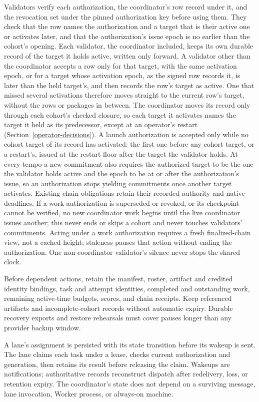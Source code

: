 Validators verify each authorization, the coordinator's row record under it,
and the revocation set under the pinned authorization key before using them.
They check that the row names the authorization and a target that is their
active one or activates later, and that the authorization's issue epoch is no
earlier than the cohort's opening. Each validator, the coordinator included,
keeps its own durable record of the target it holds active, written only
forward. A validator other than the coordinator accepts a row only for that
target, with the same activation epoch, or for a target whose activation epoch,
as the signed row records it, is later than the held target's, and then records
the row's target as active. One that missed several activations therefore moves
straight to the current row's target, without the rows or packages in between.
The coordinator moves its record only through each cohort's checked closure,
so each target it activates names the target it held as its predecessor, except
at an operator's restart (Section~\ref{operator-decisions}). A launch
authorization is accepted only while no cohort target of its record has
activated: the first one before any cohort target, or a restart's, issued at the
restart floor after the target the validator holds. At every
tempo a new commitment also requires the authorized target to be the one the
validator holds active and the epoch to be at or after the authorization's
issue, so an authorization stops yielding commitments once another target
activates. Existing chain obligations retain their recorded authority and
native deadlines. If a work
authorization is superseded or revoked, or its checkpoint cannot be verified,
no new coordinator work begins until the live coordinator issues another; this
never ends or skips a cohort and never touches validators' commitments.
Acting under a work authorization requires a fresh finalized-chain view, not a
cached height; staleness pauses that action without ending the authorization.
One non-coordinator validator's silence never
stops the shared clock.

Before dependent actions, retain the manifest, roster, artifact and credited
identity bindings, task and attempt identities, completed and outstanding work,
remaining active-time budgets, scores, and chain receipts. Keep referenced
artifacts and incomplete-cohort records without automatic expiry. Durable
recovery exports and restore rehearsals must cover pauses longer than any
provider backup window.

A lane's assignment is persisted with its state transition before its wakeup is
sent. The lane claims each task under a lease, checks current authorization and
generation, then retains its result before releasing the claim. Wakeups are
notifications; authoritative records reconstruct dispatch after redelivery,
loss, or retention expiry. The coordinator's state does not depend on a
surviving message, lane invocation, Worker process, or always-on machine.

